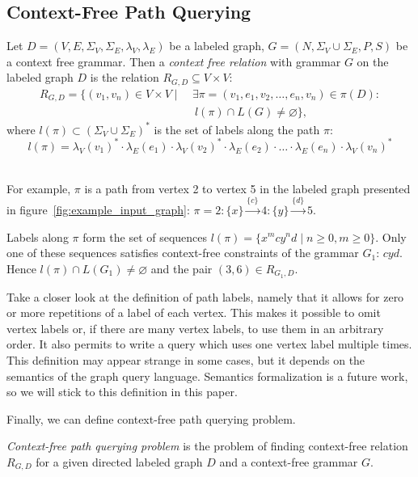 \subsection{Context-Free Path Querying}

\begin{definition}
Let $D = (V, E, \Sigma_V, \Sigma_E, \lambda_V, \lambda_E)$ be a labeled graph, $G = (N, \Sigma_V \cup \Sigma_E, P, S)$ be a context free grammar. Then a \emph{context free relation} with grammar $G$ on the labeled graph $D$ is the relation $R_{G, D} \subseteq V \times V$:
\begin{equation*} \label{eq1}
\begin{split}
R_{G, D} = \{(v_1, v_n) \in V \times V  \mid \ &\exists \pi = (v_1, e_1, v_2, \ldots, e_n, v_n) \in \pi(D): \\
      &\ l(\pi) \cap L(G) \neq \varnothing \},
\end{split}
\end{equation*}
where $l(\pi) \subset (\Sigma_V \cup \Sigma_E)^*$ is the set of labels along the path $\pi$:
$$l(\pi) = \lambda_V(v_1)^* \cdot \lambda_E(e_1) \cdot \lambda_V(v_2)^* \cdot \lambda_E(e_2) \cdot \ldots \cdot \lambda_E(e_n) \cdot \lambda_V(v_n)^*$$
\
\end{definition}

For example, $\pi$ is a path from vertex 2 to vertex 5 in the labeled graph presented in figure~\ref{fig:example_input_graph}:
$\pi=2:\{x\}\xrightarrow{\{c\}} 4:\{y\} \xrightarrow{\{d\}} 5.$

Labels along $\pi$ form the set of sequences $l(\pi) = \{x^mcy^nd \mid n \geq 0, m \geq 0\}$.
Only one of these sequences satisfies context-free constraints of the grammar $G_1$: $cyd$.
Hence $l(\pi) \cap L(G_1) \neq \varnothing$ and the pair $(3,6) \in R_{G_1, D}$.

Take a closer look at the definition of path labels, namely that it allows for zero or more repetitions of a label of each vertex.
This makes it possible to omit vertex labels or, if there are many vertex labels, to use them in an arbitrary order.
It also permits to write a query which uses one vertex label multiple times.
This definition may appear strange in some cases, but it depends on the semantics of the graph query language.
Semantics formalization is a future work, so we will stick to this definition in this paper.

Finally, we can define context-free path querying problem.
\begin{definition}
    \emph{Context-free path querying problem} is the problem of finding context-free relation $R_{G, D}$ for a given directed labeled graph $D$ and a context-free grammar $G$.
\end{definition}


